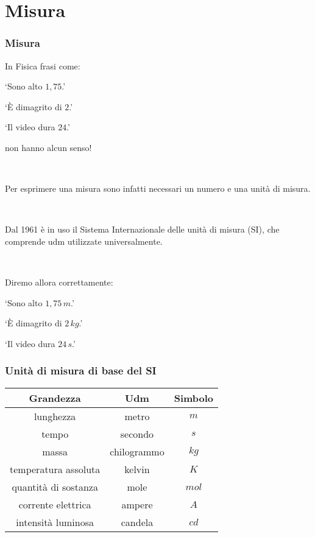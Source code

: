 \documentclass[]{beamer}
\begin{document}
\section{Misura}

\begin{frame}
\frametitle{Misura}
In Fisica frasi come:
\begin{multicols}{3}
  \begin{center}
    `Sono alto $ 1,75 $.'
    
    `È dimagrito di $ 2 $.'
    
    `Il video dura $ 24 $.'
    \end{center}
\end{multicols}
non hanno alcun senso! {\pause}

~

Per esprimere una misura sono infatti necessari \alert<2>{un numero} e una \alert<2>{unità di misura}.\pause

~

Dal 1961 è in uso il \alert<3>{Sistema Internazionale delle unità di misura (SI)}, che comprende udm utilizzate universalmente.\pause

~

Diremo allora correttamente:
\begin{multicols}{3}
  \begin{center}
    `Sono alto $ 1,75 \, m $.'
    
    `È dimagrito di $ 2 \, kg$.'
    
    `Il video dura $ 24 \, s$.'
    \end{center}
\end{multicols}
\end{frame}





\begin{frame}
\frametitle{Unità di misura di base del SI}
\begin{table}[htp]\centering
  \begin{tabular}{ccc}\hline\rule{0pt}{3ex}
        \textbf{Grandezza}    & \textbf{Udm}  & \textbf{Simbolo}\\\hline\rule{0pt}{3ex}
        lunghezza             & metro         & $ m $\\\hline\rule{0pt}{3ex}
        tempo                 & secondo       & $ s $\\\hline\rule{0pt}{3ex}
        massa                 & chilogrammo   & $ kg $ \\\hline\rule{0pt}{3ex}
        temperatura assoluta  & kelvin        & $ K $\\\hline\rule{0pt}{3ex}
        quantità di sostanza  & mole          & $ mol $\\\hline\rule{0pt}{3ex}
        corrente elettrica    & ampere        & $ A $\\\hline\rule{0pt}{3ex}
        intensità luminosa    & candela       & $ cd $\\\hline
  \end{tabular}
\end{table}
\end{frame}
\end{document}
